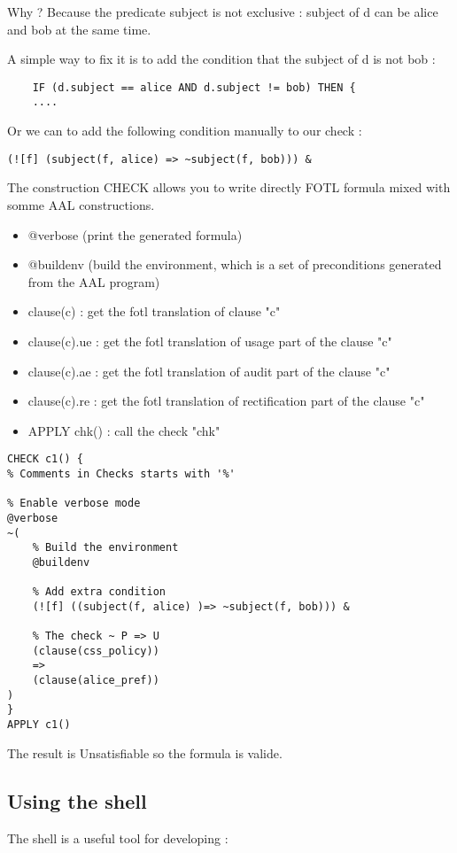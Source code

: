 Why ? Because the predicate subject is not exclusive :
subject of d can be alice and bob at the same time.

A simple way to fix it is to add the condition that the subject of d is not bob :
\begin{lstlisting}
    IF (d.subject == alice AND d.subject != bob) THEN {
    ....
\end{lstlisting}


Or we can to add the following condition manually to our check :
\begin{lstlisting}
(![f] (subject(f, alice) => ~subject(f, bob))) &
\end{lstlisting}

The construction CHECK allows you to write directly FOTL formula mixed with somme AAL constructions.

\begin{itemize}
    \item @verbose (print the generated formula)
    \item @buildenv (build the environment, which is a set of preconditions generated from the AAL program)
    \item clause(c) : get the fotl translation of clause "c"
    \item clause(c).ue : get the fotl translation of usage part of the clause "c"
    \item clause(c).ae : get the fotl translation of audit part of the clause "c"
    \item clause(c).re : get the fotl translation of rectification part of the clause "c"
    \item APPLY chk() : call the check "chk"
\end{itemize}

\begin{lstlisting}
CHECK c1() {
% Comments in Checks starts with '%'

% Enable verbose mode
@verbose
~(
    % Build the environment
    @buildenv

    % Add extra condition
    (![f] ((subject(f, alice) )=> ~subject(f, bob))) &

    % The check ~ P => U
    (clause(css_policy))
    =>
    (clause(alice_pref))
)
}
APPLY c1()
\end{lstlisting}
The result is Unsatisfiable so the formula is valide.

\subsection{Using the shell}
The shell is a useful tool for developing :

